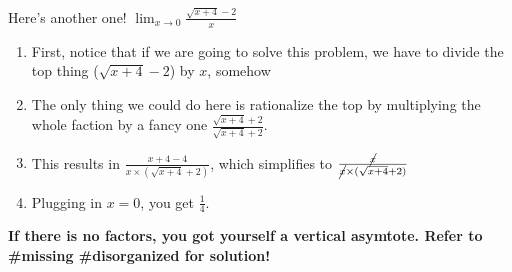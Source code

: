 \documentclass[letterpaper]{article}
\begin{document}
Here's another one! \(\lim_{x\to0} \frac{\sqrt{x+4}-2}{x}\)

\begin{enumerate}
\item First, notice that if we are going to solve this problem, we have to
divide the top thing (\(\sqrt{x+4}-2\)) by \(x\), somehow
\item The only thing we could do here is rationalize the top by multiplying
the whole faction by a fancy one
\(\frac{\sqrt{x+4}+2}{\sqrt{x+4}+2}\).
\item This results in \(\frac{x+4-4}{x\times(\sqrt{x+4}+2)}\), which
simplifies to \(\frac{\cancel{x}}{\cancel{x}\times(\sqrt{x+4}+2)}\)
\item Plugging in \(x=0\), you get \(\frac{1}{4}\).
\end{enumerate}

\textbf{If there is no factors, you got yourself a vertical asymtote. Refer to
\#missing \#disorganized for solution!}
\end{document}
